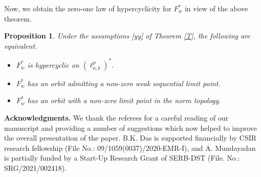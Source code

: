 \documentclass[12pt, reqno]{amsart}
\newtheorem{proposition}[theorem]{Proposition}
\theoremstyle{definition}
\theoremstyle{remark}
\numberwithin{equation}{section}
\begin{document}
Now, we obtain the zero-one law of hypercyclicity for $F_w^*$ in view of the above theorem.
\begin{proposition}
Under the assumptions \eqref{yy} of Theorem \ref{T}, the following are equivalent.
 \begin{itemize}
          \item[(i)] $F_{w}^{*}$ is hypercyclic on $(\ell^p_{a,b})^*.$
             \item[(ii)] $F_w^*$ has an orbit admitting a non-zero weak sequential limit point.
             \item[(iii)] $F_w^*$ has an orbit with a non-zero limit point in the norm topology.
      \end{itemize}
\end{proposition}

 

  


{\bf Acknowledgments.} We thank the referees for a careful reading of our manuscript and providing a number of suggestions which now helped to improve the overall presentation of the paper. B.K. Das is supported financially by CSIR research fellowship (File No.: 09/1059(0037)/2020-EMR-I), and A. Mundayadan is partially funded by a Start-Up Research Grant of SERB-DST (File. No.: SRG/2021/002418).
\end{document}
